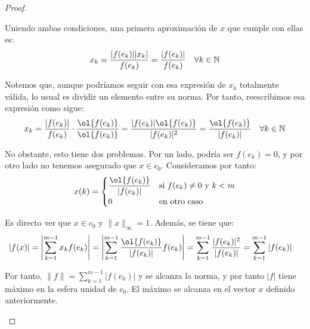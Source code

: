 \begin{ejercicio}
\begin{proof}
\begin{description}
        Uniendo ambas condiciones, una primera aproximación de $x$ que cumple con ellas es:
        \begin{equation*}
            x_k = \dfrac{|f(e_k)||x_k|}{f(e_k)} = \dfrac{|f(e_k)|}{f(e_k)} \quad \forall k\in \mathbb{N}
        \end{equation*}

        Notemos que, aunque podríamos seguir con esa expresión de $x_k$ totalmente válida, lo usual es dividir un elemento entre su norma. Por tanto, reescribimos esa expresión como sigue:
        \begin{equation*}
            x_k = \dfrac{|f(e_k)|}{f(e_k)} \cdot \dfrac{\ol{f(e_k)}}{\ol{f(e_k)}} = \dfrac{|f(e_k)|\ol{f(e_k)}}{|f(e_k)|^2} = \dfrac{\ol{f(e_k)}}{|f(e_k)|} \quad \forall k\in \bb{N}
        \end{equation*}

        No obstante, esto tiene dos problemas. Por un lado, podría ser $f(e_k)=0$, y por otro lado no tenemos asegurado que $x \in c_0$. Consideramos por tanto:
        \begin{equation*}
            x(k) = \begin{cases}
                \dfrac{\ol{f(e_k)}}{|f(e_k)|} & \text{si } f(e_k) \neq 0 \text{ y } k < m\\
                0 & \text{en otro caso}
            \end{cases}
        \end{equation*}

        Es directo ver que $x \in c_0$ y $\|x\|_\infty = 1$. Además, se tiene que:
        \begin{align*}
            |f(x)| &= \left|\sum_{k=1}^{m-1} x_k f(e_k)\right| = \left|\sum_{k=1}^{m-1}\dfrac{\ol{f(e_k)}}{|f(e_k)|} f(e_k)\right| = \sum_{k=1}^{m-1} \dfrac{|f(e_k)|^2}{|f(e_k)|} = \sum_{k=1}^{m-1} |f(e_k)|
        \end{align*}

        Por tanto, $\|f\| = \sum\limits_{k=1}^{m-1} |f(e_k)|$ y se alcanza la norma, y por tanto $|f|$ tiene máximo en la esfera unidad de $c_0$. El máximo se alcanza en el vector $x$ definido anteriormente.
    \end{description}
\end{proof}
\end{ejercicio}

